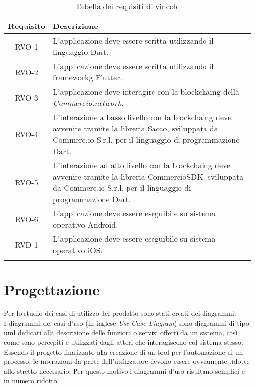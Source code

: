 \begin{longtable}{|c|p{10.5cm}|}
	\hline
	\rowcolor{gray}
	\textbf{Requisito} & \textbf{Descrizione} \\
	\hline
	RVO-1    & L'applicazione deve essere scritta utilizzando il linguaggio Dart. \\
	\hline
	RVO-2    & L'applicazione deve essere scritta utilizzando il \gls{frameworkg} Flutter. \\
	\hline
	RVO-3    & L'applicazione deve interagire con la \gls{blockchaing} della \textit{Commercio.network}. \\
	\hline
	RVO-4    & L'interazione a basso livello con la \gls{blockchaing} deve avvenire tramite la libreria Sacco, sviluppata da Commerc.io S.r.l. per il linguaggio di programmazione Dart. \\
	\hline
	RVO-5    & L'interazione ad alto livello con la \gls{blockchaing} deve avvenire tramite la libreria CommercioSDK, sviluppata da Commerc.io S.r.l. per il linguaggio di programmazione Dart. \\
	\hline
	RVO-6    & L'applicazione deve essere eseguibile su sistema operativo Android. \\
	\hline
	RVD-1    & L'applicazione deve essere eseguibile su sistema operativo iOS. \\
	\hline
	
	\caption{Tabella dei requisiti di vincolo}
	\label{tab:requisiti-vincolo}
\end{longtable}
	

\section{Progettazione}

Per lo studio dei casi di utilizzo del prodotto sono stati creati dei diagrammi.\\
I diagrammi dei casi d'uso (in inglese \emph{Use Case Diagram}) sono diagrammi di tipo \gls{uml} dedicati alla descrizione delle funzioni o servizi offerti da un sistema, così come sono percepiti e utilizzati dagli attori che interagiscono col sistema stesso.\\
Essendo il progetto finalizzato alla creazione di un tool per l'automazione di un processo, le interazioni da parte dell'utilizzatore devono essere ovviamente ridotte allo stretto necessario. Per questo motivo i diagrammi d'uso risultano semplici e in numero ridotto.


